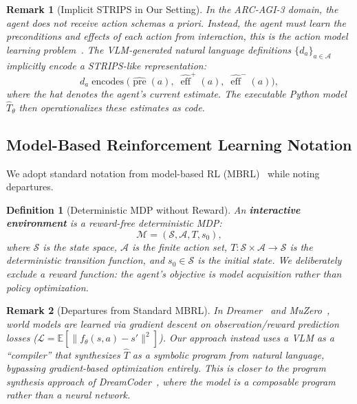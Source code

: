 \documentclass{article}
\newtheorem{definition}{Definition}
\newtheorem{remark}{Remark}
\DeclareMathOperator{\pre}{pre}
\DeclareMathOperator{\eff}{eff}
\newcommand{\calS}{\mathcal{S}}
\newcommand{\calA}{\mathcal{A}}
\newcommand{\calL}{\mathcal{L}}
\newcommand{\calM}{\mathcal{M}}
\begin{document}
\begin{remark}[Implicit STRIPS in Our Setting]
\label{rem:implicit_strips}
In the ARC-AGI-3 domain, the agent does not receive action schemas a priori.  Instead, the agent must \emph{learn} the preconditions and effects of each action from interaction, this is the \emph{action model learning} problem~\cite{cresswell2011acquiring, arora2018review, juba2021safe, stern2017efficient}.  The VLM-generated natural language definitions $\{d_a\}_{a \in \calA}$ implicitly encode a STRIPS-like representation:
\begin{equation}
\label{eq:implicit_strips}
d_a \;\text{encodes}\; \bigl(\widehat{\pre}(a),\; \widehat{\eff}^+(a),\; \widehat{\eff}^-(a)\bigr),
\end{equation}
where the hat denotes the agent's current estimate.  The executable Python model $\hat{T}_\theta$ then operationalizes these estimates as code.
\end{remark}

\subsection{Model-Based Reinforcement Learning Notation}
\label{sec:mbrl_notation}

We adopt standard notation from model-based RL (MBRL)~\cite{sutton1991dyna, ha2018world, hafner2020dreamer, schrittwieser2020muzero} while noting departures.

\begin{definition}[Deterministic MDP without Reward]
\label{def:mdp}
An \textbf{interactive environment} is a reward-free deterministic MDP:
\begin{equation}
\label{eq:mdp}
\calM = (\calS, \calA, T, s_0),
\end{equation}
where $\calS$ is the state space, $\calA$ is the finite action set, $T : \calS \times \calA \to \calS$ is the deterministic transition function, and $s_0 \in \calS$ is the initial state.  We deliberately exclude a reward function: the agent's objective is \emph{model acquisition} rather than policy optimization.
\end{definition}

\begin{remark}[Departures from Standard MBRL]
\label{rem:mbrl_departures}
In Dreamer~\cite{hafner2020dreamer} and MuZero~\cite{schrittwieser2020muzero}, world models are learned via gradient descent on observation/reward prediction losses ($\calL = \mathbb{E}[\|f_\theta(s,a) - s'\|^2]$).  Our approach instead uses a VLM as a ``compiler'' that synthesizes $\hat{T}$ as a symbolic program from natural language, bypassing gradient-based optimization entirely.  This is closer to the program synthesis approach of DreamCoder~\cite{ellis2021dreamcoder}, where the model is a composable program rather than a neural network.
\end{remark}
\end{document}
